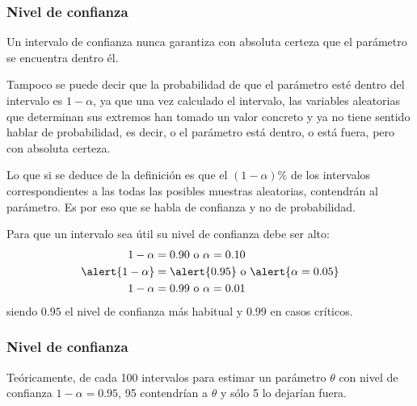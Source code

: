 \begin{frame}
\frametitle{Nivel de confianza}
Un intervalo de confianza nunca garantiza con absoluta certeza que el parámetro se encuentra dentro él.

Tampoco se puede decir que la probabilidad de que el parámetro esté dentro del intervalo es $1-\alpha$, ya que una vez calculado el intervalo, las variables aleatorias que determinan sus extremos han tomado un valor concreto y ya no tiene sentido hablar de probabilidad, es decir, o el parámetro está dentro, o está fuera, pero con absoluta certeza.

Lo que si se deduce de la definición es que el $(1-\alpha)\%$ de los intervalos correspondientes a las todas las posibles muestras aleatorias, contendrán al parámetro. Es por eso que se habla de \alert{confianza} y no de probabilidad.

Para que un intervalo sea útil su nivel de confianza debe ser alto:
\[
\begin{align*}
1-\alpha &= 0.90 \mbox{ o } \alpha=0.10\\
\alert{1-\alpha} &= \alert{0.95} \mbox{ o } \alert{\alpha=0.05}\\
1-\alpha &= 0.99 \mbox{ o } \alpha=0.01\\
\end{align*}
\]
siendo $0.95$ el nivel de confianza más habitual y $0.99$ en casos críticos.
\end{frame}


\begin{frame}
\frametitle{Nivel de confianza}
Teóricamente, de cada 100 intervalos para estimar un parámetro $\theta$ con nivel de confianza $1-\alpha=0.95$, 95 contendrían a $\theta$ y sólo 5 lo dejarían fuera.
\begin{center}
\scalebox{0.9}{}
\end{center}
\end{frame}


